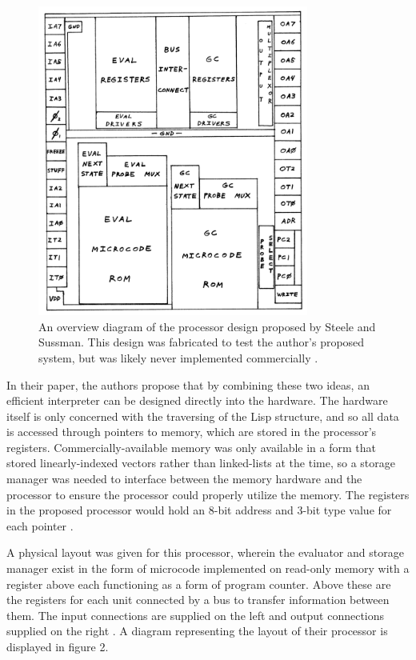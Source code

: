 \documentclass[journal]{IEEEtran}
\begin{document}
\begin{figure}[!t]
	\centering
	\includegraphics[width=3.5in]{SS_Processor_Diagram}
	\caption{An overview diagram of the processor design proposed by Steele and Sussman. This design was fabricated to test the author's proposed system, but was likely never implemented commercially \cite{ss}.}
	\label{Data representation}
\end{figure}


In their paper, the authors propose that by combining these two ideas, an efficient interpreter can be designed directly into the hardware. The hardware itself is only concerned with the traversing of the Lisp structure, and so all data is accessed through pointers to memory, which are stored in the processor's registers. Commercially-available memory was only available in a form that stored linearly-indexed vectors rather than linked-lists at the time, so a storage manager was needed to interface between the memory hardware and the processor to ensure the processor could properly utilize the memory. The registers in the proposed processor would hold an 8-bit address and 3-bit type value for each pointer \cite{ss}.

A physical layout was given for this processor, wherein the evaluator and storage manager exist in the form of microcode implemented on read-only memory with a register above each functioning as a form of program counter. Above these are the registers for each unit connected by a bus to transfer information between them. The input connections are supplied on the left and output connections supplied on the right \cite{ss}. A diagram representing the layout of their processor is displayed in figure 2.
\end{document}
